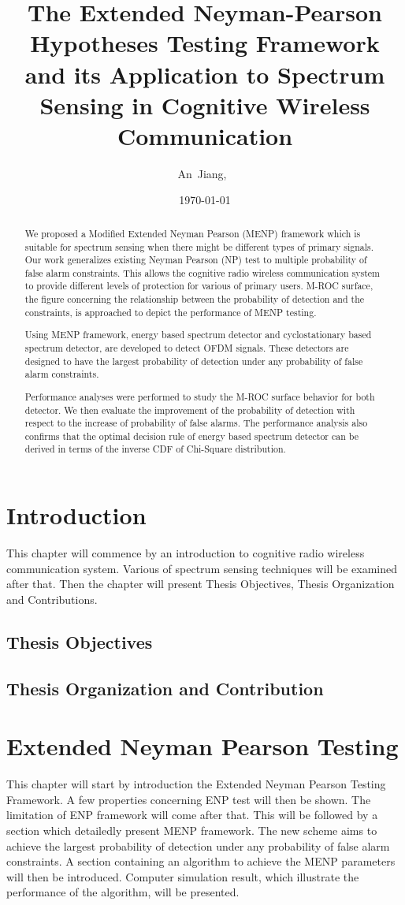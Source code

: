\documentclass{article}
\author{An~Jiang,~
    }
\title{The Extended Neyman-Pearson Hypotheses Testing Framework and its Application to Spectrum Sensing in Cognitive Wireless Communication}
\date{\today}
\begin{document}
\begin{spacing}{2.0}
\maketitle
\begin{abstract}
We proposed a Modified Extended Neyman Pearson (MENP) framework which is suitable for spectrum sensing when there might be different types of primary signals. Our work generalizes existing Neyman Pearson (NP) test to multiple probability of false alarm constraints. This allows the cognitive radio wireless communication system to provide different levels of protection for various of primary users.  
M-ROC surface, the figure concerning the relationship between the probability of detection and the constraints, is approached to depict the performance of MENP testing.   

Using MENP framework, energy based spectrum detector and cyclostationary based spectrum detector, are developed to detect OFDM signals. These detectors are designed to have the largest probability of detection under any probability of false alarm constraints.  

Performance analyses were performed to study the M-ROC surface behavior for both detector. We then evaluate the improvement of the probability of detection with respect to the increase of probability of false alarms.  
The performance analysis also confirms that the optimal decision rule of energy based spectrum detector can be derived in terms of the inverse CDF of Chi-Square distribution.  
\end{abstract}

\section{Introduction}
This chapter will commence by an introduction to cognitive radio wireless communication system. Various of spectrum sensing techniques will be examined after that. 
Then the chapter will present Thesis Objectives, Thesis Organization and Contributions.
\subsection{Thesis Objectives}
\subsection{Thesis Organization and Contribution}
\newpage
\section{Extended Neyman Pearson Testing }
This chapter will start by introduction the Extended Neyman Pearson Testing Framework. A few properties concerning ENP test will then be shown. The limitation of ENP framework will come after that. This will be followed by a section which detailedly present MENP framework. The new scheme aims to achieve the largest probability of detection under any probability of false alarm constraints. A section containing an algorithm to achieve the MENP parameters will then be introduced. Computer simulation result, which illustrate the performance of the algorithm, will be presented.  

\end{spacing}
\end{document}
